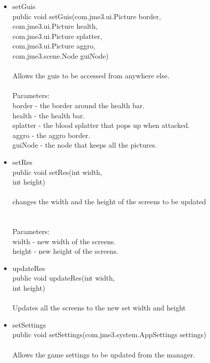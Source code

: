 \documentclass[letterpaper]{article}
\begin{document}
\begin{itemize}
\begin{itemize}
\item setGuis \\
public void setGuis(com.jme3.ui.Picture border, \\
com.jme3.ui.Picture health, \\
com.jme3.ui.Picture splatter, \\
com.jme3.ui.Picture aggro, \\
com.jme3.scene.Node guiNode) \\ \\
Allows the guis to be accessed from anywhere else.\\ \\
Parameters: \\
    border - the border around the health bar.\\
    health - the health bar. \\
    splatter - the blood splatter that pops up when attacked. \\
    aggro - the aggro border. \\
    guiNode - the node that keeps all the pictures.\\


\item setRes \\
public void setRes(int width, \\
int height) \\ \\
changes the width and the height of the screens to be updated \\ \\ \\
Parameters: \\
    width - new width of the screens. \\
    height - new height of the screens. \\

\item updateRes \\
public void updateRes(int width, \\                 int height) \\ \\
Updates all the screens to the new set width and height \\



\item setSettings \\
public void setSettings(com.jme3.system.AppSettings settings) \\ \\
Allows the game settings to be updated from the manager. \\ 


\end{itemize}
\end{itemize}
\end{document}
